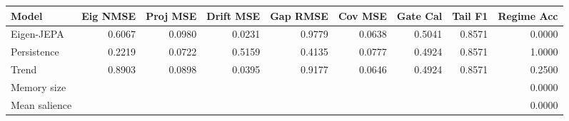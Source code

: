 \begin{tabular}{lrrrrrrrr}
\toprule
Model & Eig NMSE & Proj MSE & Drift MSE & Gap RMSE & Cov MSE & Gate Cal & Tail F1 & Regime Acc \\
\midrule
Eigen-JEPA & 0.6067 & 0.0980 & 0.0231 & 0.9779 & 0.0638 & 0.5041 & 0.8571 & 0.0000 \\
Persistence & 0.2219 & 0.0722 & 0.5159 & 0.4135 & 0.0777 & 0.4924 & 0.8571 & 1.0000 \\
Trend & 0.8903 & 0.0898 & 0.0395 & 0.9177 & 0.0646 & 0.4924 & 0.8571 & 0.2500 \\
\midrule
Memory size & \multicolumn{8}{r}{0.0000} \\
Mean salience & \multicolumn{8}{r}{0.0000} \\
\bottomrule
\end{tabular}